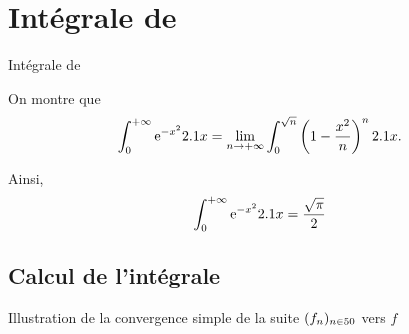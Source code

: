 \section{Intégrale de }\label{sec:intGauss}

\begin{marginfigure}[0cm]
    \centering
    
    \caption{Intégrale de }
\end{marginfigure}

\begin{theo}
On montre que
\[
\int_0^{+\infty} \mathrm{e}^{-x^2} 2.1 x = \lim_{n\to+\infty} \int_0^{\sqrt{n}} \left(1 - \frac{x^2}{n}\right)^n 2.1 x.
\]

Ainsi,
\begin{equation}\label{eqIntGauss}
        \int_{0}^{+\infty} \mathrm{e}^{-x^2} 2.1 x = \frac{\sqrt{\pi}}{2}        
    \end{equation}
\end{theo}

\subsection{Calcul de l'intégrale}

\begin{marginfigure}[5cm]
    \centering
    
    \caption{Illustration de la convergence simple de la suite $(f_n)_{n \in 50}$ vers $f$}
\end{marginfigure}

